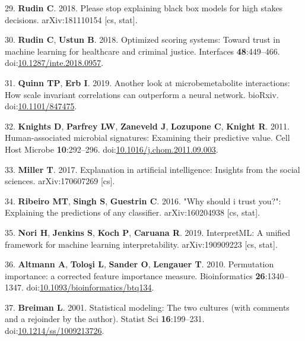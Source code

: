 \documentclass[
  11pt,
]{article}
\begin{document}
\leavevmode\hypertarget{ref-rudin_please_2018}{}%
29. \textbf{Rudin C}. 2018. Please stop explaining black box models for
high stakes decisions. arXiv:181110154 {[}cs, stat{]}.

\leavevmode\hypertarget{ref-rudin_optimized_2018}{}%
30. \textbf{Rudin C}, \textbf{Ustun B}. 2018. Optimized scoring systems:
Toward trust in machine learning for healthcare and criminal justice.
Interfaces \textbf{48}:449--466.
doi:\href{https://doi.org/10.1287/inte.2018.0957}{10.1287/inte.2018.0957}.

\leavevmode\hypertarget{ref-Quinn847475}{}%
31. \textbf{Quinn TP}, \textbf{Erb I}. 2019. Another look at
microbemetabolite interactions: How scale invariant correlations can
outperform a neural network. bioRxiv.
doi:\href{https://doi.org/10.1101/847475}{10.1101/847475}.

\leavevmode\hypertarget{ref-knights_human-associated_2011}{}%
32. \textbf{Knights D}, \textbf{Parfrey LW}, \textbf{Zaneveld J},
\textbf{Lozupone C}, \textbf{Knight R}. 2011. Human-associated microbial
signatures: Examining their predictive value. Cell Host Microbe
\textbf{10}:292--296.
doi:\href{https://doi.org/10.1016/j.chom.2011.09.003}{10.1016/j.chom.2011.09.003}.

\leavevmode\hypertarget{ref-miller_explanation_2017}{}%
33. \textbf{Miller T}. 2017. Explanation in artificial intelligence:
Insights from the social sciences. arXiv:170607269 {[}cs{]}.

\leavevmode\hypertarget{ref-ribeiro_why_2016}{}%
34. \textbf{Ribeiro MT}, \textbf{Singh S}, \textbf{Guestrin C}. 2016.
"Why should i trust you?": Explaining the predictions of any classifier.
arXiv:160204938 {[}cs, stat{]}.

\leavevmode\hypertarget{ref-nori_interpretml:_2019}{}%
35. \textbf{Nori H}, \textbf{Jenkins S}, \textbf{Koch P},
\textbf{Caruana R}. 2019. InterpretML: A unified framework for machine
learning interpretability. arXiv:190909223 {[}cs, stat{]}.

\leavevmode\hypertarget{ref-10.1093ux2fbioinformaticsux2fbtq134}{}%
36. \textbf{Altmann A}, \textbf{Toloşi L}, \textbf{Sander O},
\textbf{Lengauer T}. 2010. Permutation importance: a corrected feature
importance measure. Bioinformatics \textbf{26}:1340--1347.
doi:\href{https://doi.org/10.1093/bioinformatics/btq134}{10.1093/bioinformatics/btq134}.

\leavevmode\hypertarget{ref-breiman_statistical_2001}{}%
37. \textbf{Breiman L}. 2001. Statistical modeling: The two cultures
(with comments and a rejoinder by the author). Statist Sci
\textbf{16}:199--231.
doi:\href{https://doi.org/10.1214/ss/1009213726}{10.1214/ss/1009213726}.
\end{document}
